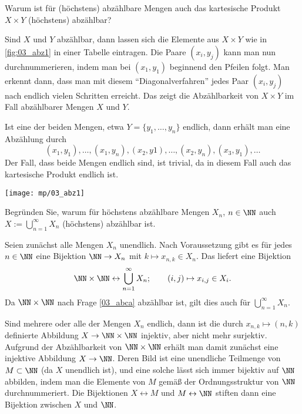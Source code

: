 \begin{frage}\label{03_abca}
  Warum ist für (höchstens) abzählbare Mengen auch das kartesische Produkt 
  $X\times Y$ (höchstens) abzählbar?
\end{frage}

\begin{antwort}
  Sind $X$ und $Y$ abzählbar, dann lassen sich die Elemente 
  aus $X\times Y$ wie in \Abb\ref{fig:03_abz1} in einer Tabelle eintragen. 
  Die Paare $(x_i,y_j)$ kann man nun durchnummerieren, indem man  
  bei $(x_1,y_1)$ beginnend den Pfeilen folgt. Man erkennt dann, 
  dass man mit diesem "`Diagonalverfahren"' jedes Paar $(x_i,y_j)$  
  nach endlich vielen Schritten erreicht. 
  Das zeigt die Abzählbarkeit von $X\times Y$ im Fall abzählbarer Mengen 
  $X$ und $Y$. 

  Ist eine der beiden Mengen, etwa $Y=\{ y_1 , \ldots, y_n \}$ endlich, 
  dann erhält man eine Abzählung durch 
  \[
  (x_1, y_1),\ldots, (x_1,y_n), (x_2,y1), \ldots, (x_2,y_n), (x_3,y_1), \ldots
  \]
  Der Fall, dass beide Mengen endlich sind, ist trivial, da in diesem 
  Fall auch das kartesische Produkt endlich ist.
  \AntEnd

  \begin{center}
    \texttt{[image: mp/03\_abz1]}
    \label{fig:03_abz1}
  \end{center}
  
\end{antwort}

\begin{frage}\label{03_abv}
  Begründen Sie, warum für höchstens abzählbare Mengen $X_n$, $n\in\NN$ auch 
  $X := \bigcup_{n=1}^\infty X_n$ (höchstens) abzählbar ist.
\end{frage}

\begin{antwort}
  Seien zunächst alle Mengen $X_n$ unendlich. 
  Nach Voraussetzung gibt es für jedes $n\in \NN$ eine Bijektion 
  $\NN \to X_n$ mit $k \mapsto x_{n,k}\in X_n$. Das liefert eine Bijektion   
  \[
  \NN \times \NN \leftrightarrow \bigcup_{n=1}^\infty X_n; 
  \qquad (i,j) \mapsto x_{i,j} \in X_i.
  \]
  Da $\NN\times\NN$ nach Frage \ref{03_abca} abzählbar ist, gilt dies 
  auch für $\bigcup_{n=1}^\infty X_n$. 

  Sind mehrere oder alle der Mengen $X_n$ endlich, dann ist die durch 
  $x_{n,k}\mapsto (n,k)$ definierte Abbildung $X\to \NN\times\NN$ injektiv, 
  aber nicht mehr surjektiv. Aufgrund der Abzählbarkeit von $\NN\times\NN$ 
  erhält man damit zunächst eine injektive Abbildung 
  $X\to \NN$. Deren Bild ist eine unendliche Teilmenge 
  von $M\subset \NN$ (da $X$ unendlich ist), 
  und eine solche lässt sich immer bijektiv auf $\NN$ abbilden, indem 
  man die Elemente von $M$ gemäß der Ordnungsstruktur von 
  $\NN$ durchnummeriert. Die Bijektionen $X\leftrightarrow M$ und 
  $M \leftrightarrow \NN$ stiften dann eine Bijektion zwischen 
  $X$ und $\NN$.     
  \AntEnd
\end{antwort}

